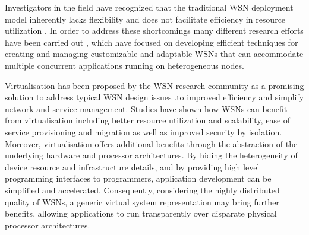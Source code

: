%


Investigators in the field have recognized that the traditional WSN deployment model inherently lacks flexibility and does not facilitate efficiency in resource utilization \cite{islam2012virtualization}. In order to address these shortcomings many different research efforts have been carried out  \cite{virtual_sensor_networks,Leontiadis:2012:STS:2187181.2187188,Fok:2009:AMA:1552297.1552299}, which have focused on developing efficient techniques for creating and managing customizable and adaptable WSNs that can accommodate multiple concurrent applications running on heterogeneous nodes.  

Virtualisation has been proposed by the WSN research community as a promising solution to address typical WSN design issues \cite{islam2012survey}.to improved efficiency and simplify network and service management. Studies have shown how WSNs can benefit from virtualisation \cite{6076694} including better resource utilization and scalability, ease of service provisioning and migration as well as improved security by isolation. Moreover, virtualisation offers additional benefits through the abstraction of the underlying hardware and processor architectures. By hiding the heterogeneity of device resource and infrastructure details, and by providing high level programming interfaces to programmers, application development can be simplified and accelerated. Consequently, considering the highly distributed quality of WSNs, a generic virtual system representation may bring further benefits, allowing applications to run transparently over disparate physical processor architectures.  

